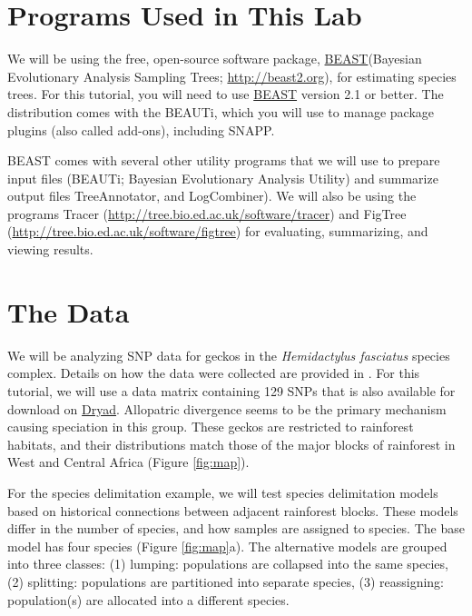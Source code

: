 \documentclass{article}
\newcommand{\program}[1]{#1\xspace}
\newcommand{\beast}{\href{http://beast2.org}{\program{BEAST}}\xspace}
\begin{document}
\section{Programs Used in This Lab}
We will be using the free, open-source software package, \beast (Bayesian
Evolutionary Analysis Sampling Trees;
\href{http://beast2.org}{\url{http://beast2.org}}), for
estimating species trees.
For this tutorial, you will need to use \beast version 2.1 or better. 
The distribution comes with the \program{BEAUTi}, which you will use to manage package plugins (also called add-ons), including \program{SNAPP}.

\program{BEAST} comes with several other utility programs that we will use to prepare 
input files (\program{BEAUTi}; Bayesian Evolutionary Analysis
Utility) and summarize output files \program{TreeAnnotator}, and \program{LogCombiner}).
We will also be using the programs \program{Tracer}
(\href{http://tree.bio.ed.ac.uk/software/tracer}{\url{http://tree.bio.ed.ac.uk/software/tracer}})
and \program{FigTree}
(\href{http://tree.bio.ed.ac.uk/software/figtree}{\url{http://tree.bio.ed.ac.uk/software/figtree}})
for evaluating, summarizing, and viewing results.

\section{The Data}
We will be analyzing SNP data for geckos in the \textit{Hemidactylus fasciatus} species complex. Details on how the data were collected are 
provided in \citep{Leache14}. For this tutorial, we will use a data matrix containing 129 SNPs that is also available for download on \href{http://datadryad.org/resource/doi:10.5061/dryad.r55fb}{Dryad}. Allopatric divergence seems to be the primary mechanism causing speciation in this group. These geckos are restricted to rainforest habitats, and their distributions match those of the major blocks of rainforest in West and Central Africa (Figure \ref{fig:map}). 

For the species delimitation example, we will test species delimitation models based on historical connections between adjacent rainforest blocks. These models differ in the number of species, and how samples are assigned to species. The base model has four species (Figure \ref{fig:map}a). The alternative models are grouped into three classes: (1) lumping: populations are collapsed into the same species, (2) splitting: populations are partitioned into separate species, (3) reassigning: population(s) are allocated into a different species.
\end{document}
